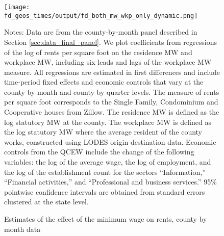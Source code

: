 
\begin{figure}[h!]
    \centering
    \caption{Estimates of the effect of the minimum wage on rents, county by month data}
    \label{fig:dynamic_county_month}

	\texttt{[image: fd\_geos\_times/output/fd\_both\_mw\_wkp\_only\_dynamic.png]}

    \begin{minipage}{.95\textwidth} \footnotesize
        \vspace{3mm}
        Notes:
        Data are from the county-by-month panel described in Section 
        \ref{sec:data_final_panel}.
        We plot coefficients from regressions of the log of rents per
        square foot on the residence MW and workplace MW, including 
        six leads and lags of the workplace MW measure.
        All regressions are estimated in first differences and include 
        time-period fixed effects and economic controls that vary at the 
        county by month and county by quarter levels.
        The measure of rents per square foot corresponds to the Single Family, 
        Condominium and Cooperative houses from Zillow.
        The residence MW is defined as the log statutory MW at the county.
        The workplace MW is defined as the log statutory MW where the average 
        resident of the county works, constructed using LODES 
        origin-destination data.
        Economic controls from the QCEW include the change of the following 
        variables: the log of the average wage, the log of employment, and the 
        log of the establishment count for the sectors ``Information,'' 
        ``Financial activities,'' and ``Professional and business services.''
        95\% pointwise confidence intervals are obtained from standard errors 
        clustered at the state level.
    \end{minipage}
\end{figure}
